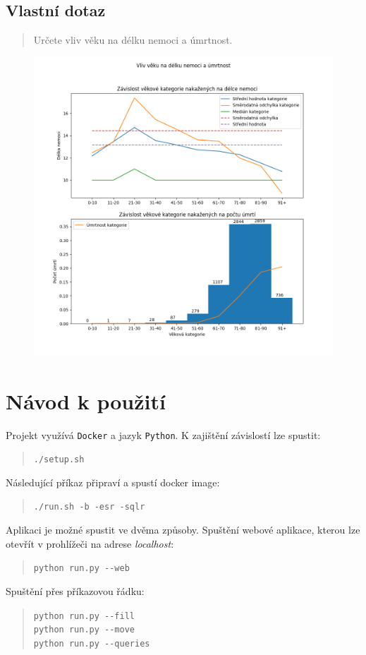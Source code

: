 \documentclass[11pt,a4paper,titlepage]{article}
\begin{document}
\newpage
\subsection{Vlastní dotaz}
\begin{quote}
Určete vliv věku na délku nemoci a úmrtnost.
\end{quote}

\begin{figure}[h]
    \centering
    \includegraphics[width=\textwidth]{img/vlastni_dotaz.png}
    \label{fig:external_country}
\end{figure}

\newpage
\section{Návod k použití}
Projekt využívá \texttt{Docker}\cite{docker} a jazyk \texttt{Python}\cite{python}. K zajištění závislostí lze spustit:
\begin{quote}
    \verb|./setup.sh|
\end{quote}
Následující příkaz připraví a spustí docker image:
\begin{quote}
    \verb|./run.sh -b -esr -sqlr|
\end{quote}
Aplikaci je možné spustit ve dvěma způsoby.
Spuštění webové aplikace, kterou lze otevřít v prohlížeči na adrese \textit{localhost}:
\begin{quote}
    \verb|python run.py --web|
\end{quote}
Spuštění přes příkazovou řádku:
\begin{quote}
    \verb|python run.py --fill|\\
    \verb|python run.py --move|\\
    \verb|python run.py --queries|
\end{quote}






\newpage

\end{document}
